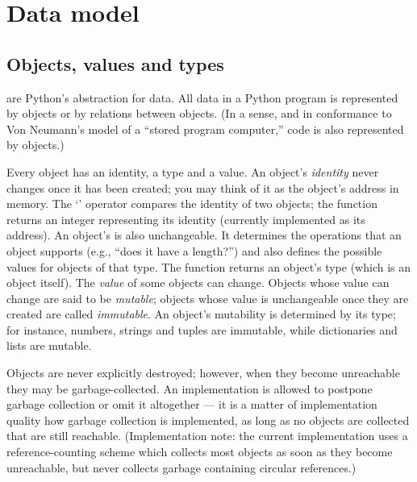 \chapter{Data model\label{datamodel}}

\section{Objects, values and types\label{objects}}

 are Python's abstraction for data.  All data in a Python
program is represented by objects or by relations between objects.
(In a sense, and in conformance to Von Neumann's model of a
``stored program computer,'' code is also represented by objects.)

Every object has an identity, a type and a value.  An object's
\emph{identity} never changes once it has been created; you may think
of it as the object's address in memory.  The `' operator
compares the identity of two objects; the
 function returns an integer
representing its identity (currently implemented as its address).
An object's  is
also unchangeable.  It determines the operations that an object
supports (e.g., ``does it have a length?'') and also defines the
possible values for objects of that type.  The
 function returns an object's type
(which is an object itself).  The \emph{value} of some
objects can change.  Objects whose value can change are said to be
\emph{mutable}; objects whose value is unchangeable once they are
created are called \emph{immutable}.
An object's mutability is determined by its type; for instance,
numbers, strings and tuples are immutable, while dictionaries and
lists are mutable.

Objects are never explicitly destroyed; however, when they become
unreachable they may be garbage-collected.  An implementation is
allowed to postpone garbage collection or omit it altogether --- it is
a matter of implementation quality how garbage collection is
implemented, as long as no objects are collected that are still
reachable.  (Implementation note: the current implementation uses a
reference-counting scheme which collects most objects as soon as they
become unreachable, but never collects garbage containing circular
references.)

